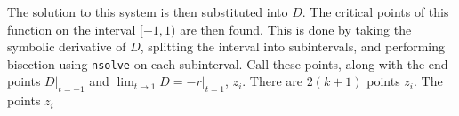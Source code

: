 The solution to this system is then substituted into $D$. The critical points
of this function on the interval $[-1, 1)$ are then found. This is done by
taking the symbolic derivative of $D$, splitting the interval into
subintervals, and performing bisection using \texttt{nsolve} on each
subinterval. Call these points, along with the end-points $D|_{t=-1}$ and
$\lim_{t\to 1} D=-r|_{t=1}$, $z_i$. There are $2(k+1)$ points $z_i$. The
points $z_i$
